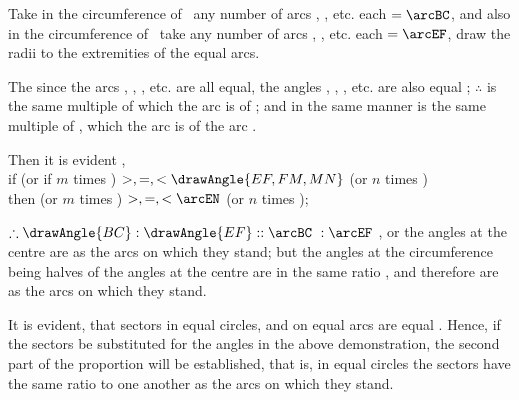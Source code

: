 \documentclass[booklanguage=english]{byrnebook}
\begin{document}
Take in the circumference of \circleG\ any number of arcs
,
, etc. each $= \arcBC$, and also in the circumference of \circleH\ take any number of arcs
,
, etc. each $= \arcEF$, draw the radii to the extremities of the equal arcs.

The since the arcs \arcBC, \arcCK, \arcKL, etc. are all equal, the angles , , , etc. are also equal ; $\therefore$  is the same multiple of  which the arc  is of \arcBC; and in the same manner  is the same multiple of , which the arc  is of the arc \arcEF.

\begin{center}
Then it is evident ,\\
if  (or if $m$ times ) $>, =, < \drawAngle{EF,FM,MN}$ (or $n$ times )\\
then \arcBL (or $m$ times \arcBC) $>, =, < \arcEN$ (or $n$ times \arcEF);
\end{center}

$\therefore \drawAngle{BC} : \drawAngle{EF} :: \arcBC\ : \arcEF$ , or the angles at the centre are as the arcs on which they stand; but the angles at the circumference being halves of the angles at the centre  are in the same ratio , and therefore are as the arcs on which they stand.

It is evident, that sectors in equal circles, and on equal arcs are equal . Hence, if the sectors be substituted for the angles in the above demonstration, the second part of the proportion will be established, that is, in equal circles the sectors have the same ratio to one another as the arcs on which they stand.
\end{document}
